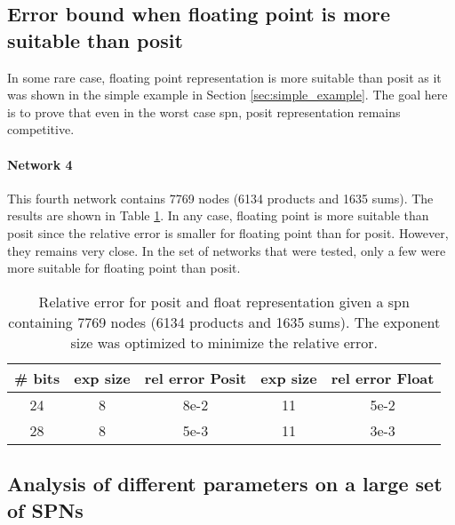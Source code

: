 \subsection{Error bound when floating point is more suitable than posit}

In some rare case, floating point representation is more suitable than posit as it was shown in the simple example in Section \ref{sec:simple_example}. The goal here is to prove that even in the worst case \gls{spn}, posit representation remains competitive.

\paragraph{Network 4}

This fourth network contains 7769 nodes (6134 products and 1635 sums). The results are shown in Table \ref{tab:net4_res}. In any case, floating point is more suitable than posit since the relative error is smaller for floating point than for posit. However, they remains very close. In the set of networks that were tested, only a few were more suitable for floating point than posit.

\begin{table}[!ht]
	\centering
	\caption{Relative error for posit and float representation given a \gls{spn} containing 7769 nodes (6134 products and 1635 sums). The exponent size was optimized to minimize the relative error.}
	\label{tab:net4_res}
	\begin{tabular}{|c||c|c||c|c|}
	\hline
		\# bits & exp size & rel error Posit & exp size & rel error Float \\
	\hline
		24 & 8 & 8e-2 & 11 & 5e-2 \\
		28 & 8 & 5e-3 & 11 & 3e-3 \\
	\hline
	\end{tabular}
\end{table}



\subsection{Analysis of different parameters on a large set of SPNs}

